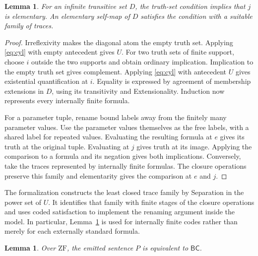 \documentclass[11pt,letterpaper]{article}
\newtheorem{lemma}[theorem]{Lemma}
\theoremstyle{definition}
\newcommand{\ZF}{\mathrm{ZF}}
\newcommand{\cardB}{\mathsf{BC}}
\begin{document}
\begin{lemma}\label{lem:elementarity}
For an infinite transitive set $D$, the truth-set condition implies
that $j$ is elementary. An elementary self-map of $D$ satisfies the
condition with a suitable family of traces.
\end{lemma}

\begin{proof}
Irreflexivity makes the diagonal atom the empty truth set. Applying
\eqref{eq:cyl} with empty antecedent gives $U$. For two truth sets
of finite support, choose $i$ outside the two supports and obtain
ordinary implication. Implication to the empty truth set gives
complement. Applying \eqref{eq:cyl} with antecedent $U$ gives
existential quantification at $i$. Equality is expressed by agreement
of membership extensions in $D$, using its transitivity and
Extensionality. Induction now represents every internally finite
formula.

For a parameter tuple, rename bound labels away from the finitely
many parameter values. Use the parameter values themselves as
the free labels, with a shared label for repeated values. Evaluating the
resulting formula at $e$ gives its truth at the original tuple.
Evaluating at $j$ gives truth at its image. Applying the comparison
to a formula and its negation gives both implications. Conversely,
take the traces represented by internally finite formulas.
The closure operations preserve this family and elementarity
gives the comparison at $e$ and $j$.
\end{proof}

The formalization constructs the least closed trace family by
Separation in the power set of $U$. It identifies that family with
finite stages of the closure operations and uses coded satisfaction
to implement the renaming argument inside the model. In particular,
Lemma~\ref{lem:elementarity} is used for internally finite codes
rather than merely for each externally standard formula.

\begin{lemma}\label{lem:berkeley}
Over $\ZF$, the emitted sentence $P$ is equivalent to $\cardB$.
\end{lemma}
\end{document}
